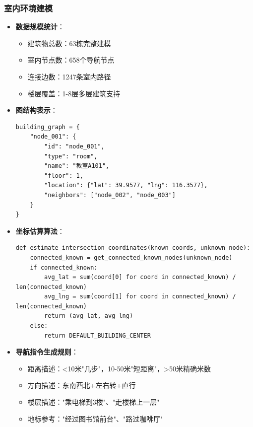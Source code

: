 \documentclass[12pt,a4paper]{article}
\begin{document}
\subsubsection{室内环境建模}
\begin{itemize}
    \item \textbf{数据规模统计}：
    \begin{itemize}
        \item 建筑物总数：63栋完整建模
        \item 室内节点数：658个导航节点
        \item 连接边数：1247条室内路径
        \item 楼层覆盖：1-8层多层建筑支持
    \end{itemize}
    \item \textbf{图结构表示}：
    \begin{verbatim}
building_graph = {
    "node_001": {
        "id": "node_001",
        "type": "room",
        "name": "教室A101", 
        "floor": 1,
        "location": {"lat": 39.9577, "lng": 116.3577},
        "neighbors": ["node_002", "node_003"]
    }
}
    \end{verbatim}
    \item \textbf{坐标估算算法}：
    \begin{verbatim}
def estimate_intersection_coordinates(known_coords, unknown_node):
    connected_known = get_connected_known_nodes(unknown_node)
    if connected_known:
        avg_lat = sum(coord[0] for coord in connected_known) / len(connected_known)
        avg_lng = sum(coord[1] for coord in connected_known) / len(connected_known)
        return (avg_lat, avg_lng)
    else:
        return DEFAULT_BUILDING_CENTER
    \end{verbatim}
    \item \textbf{导航指令生成规则}：
    \begin{itemize}
        \item 距离描述：<10米"几步"，10-50米"短距离"，>50米精确米数
        \item 方向描述：东南西北+左右转+直行
        \item 楼层描述："乘电梯到3楼"、"走楼梯上一层"
        \item 地标参考："经过图书馆前台"、"路过咖啡厅"
    \end{itemize}
\end{itemize}
\end{document}
